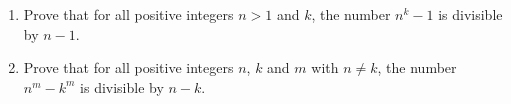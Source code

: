\begin{enumerate}
\item[(a)] Prove that for all positive integers $n>1$ and $k$, the number $n^k-1$ is divisible by $n-1$.
\item[(b)] Prove that for all positive integers $n$, $k$ and $m$ with $n\ne k$, the number $n^m-k^m$ is divisible by $n-k$.
\end{enumerate}
